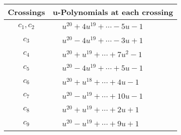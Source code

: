 \documentclass[1p]{elsarticle_modified}
\theoremstyle{definition}
\begin{document}
\begin{tabular}{m{50pt}|m{274pt}}
Crossings & \hspace{64pt}u-Polynomials at each crossing \\
\hline $$\begin{aligned}c_{1},c_{2}\end{aligned}$$&$\begin{aligned}
&u^{20}+4 u^{19}+\cdots-5 u-1
\end{aligned}$\\
\hline $$\begin{aligned}c_{3}\end{aligned}$$&$\begin{aligned}
&u^{20}-4 u^{19}+\cdots-3 u+1
\end{aligned}$\\
\hline $$\begin{aligned}c_{4}\end{aligned}$$&$\begin{aligned}
&u^{20}+u^{19}+\cdots+7 u^2-1
\end{aligned}$\\
\hline $$\begin{aligned}c_{5}\end{aligned}$$&$\begin{aligned}
&u^{20}-4 u^{19}+\cdots+5 u-1
\end{aligned}$\\
\hline $$\begin{aligned}c_{6}\end{aligned}$$&$\begin{aligned}
&u^{20}+u^{18}+\cdots+4 u-1
\end{aligned}$\\
\hline $$\begin{aligned}c_{7}\end{aligned}$$&$\begin{aligned}
&u^{20}- u^{19}+\cdots+10 u-1
\end{aligned}$\\
\hline $$\begin{aligned}c_{8}\end{aligned}$$&$\begin{aligned}
&u^{20}+u^{19}+\cdots+2 u+1
\end{aligned}$\\
\hline $$\begin{aligned}c_{9}\end{aligned}$$&$\begin{aligned}
&u^{20}- u^{19}+\cdots+9 u+1
\end{aligned}$\\

\end{tabular}
\end{document}
